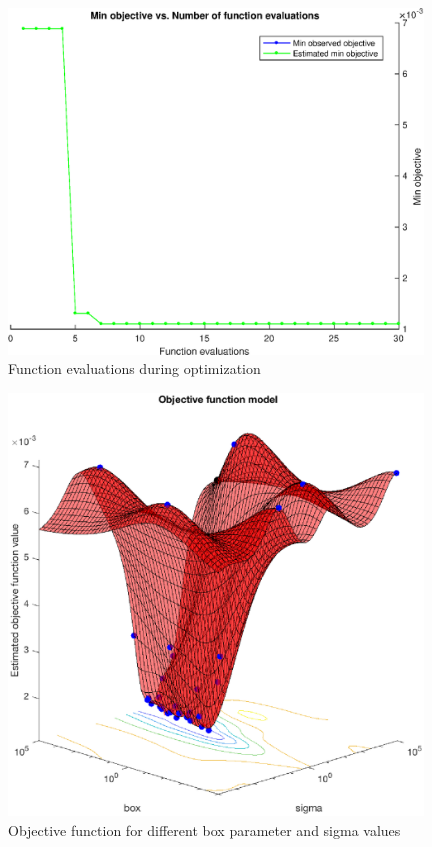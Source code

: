 \begin{figure}
\begin{center}
\includegraphics[width=11cm]{figures/funcEval2}    %
\caption{Function evaluations during optimization} 
\label{fig:funcEval1}
\end{center}
\end{figure}

\begin{figure}
\begin{center}
\includegraphics[width=11cm]{figures/objFunc2}    %
\caption{Objective function for different box parameter and sigma values} 
\label{fig:objFunc1}
\end{center}
\end{figure}

